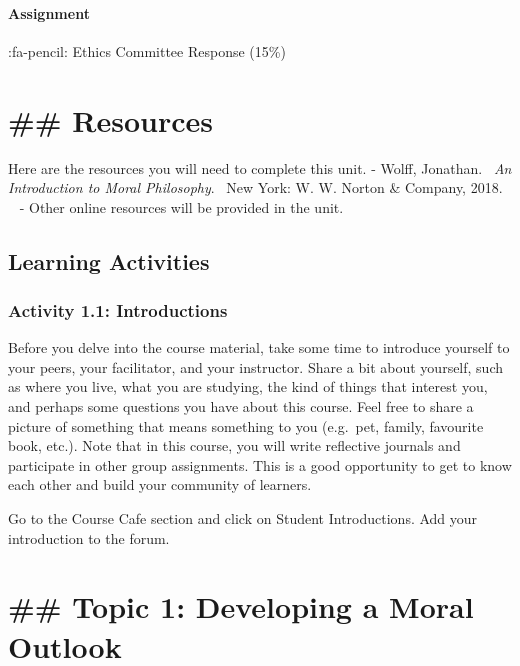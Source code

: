 \documentclass[
]{book}
\begin{document}
\hypertarget{assignment}{%
\paragraph{\texorpdfstring{\textbf{Assignment}}{Assignment}}\label{assignment}}

:fa-pencil: Ethics Committee Response (15\%)

\hypertarget{resources}{%
\section{\#\# Resources}\label{resources}}

Here are the resources you will need to complete this unit.
- Wolff, Jonathan. ~\emph{An Introduction to Moral Philosophy}. ~New York: W. W. Norton \& Company, 2018. ~
- Other online resources will be provided in the unit.

\hypertarget{learning-activities}{%
\subsection{Learning Activities}\label{learning-activities}}

\hypertarget{activity-1.1-introductions-1}{%
\subsubsection{Activity 1.1: Introductions}\label{activity-1.1-introductions-1}}

Before you delve into the course material, take some time to introduce yourself to your peers, your facilitator, and your instructor. Share a bit about yourself, such as where you live, what you are studying, the kind of things that interest you, and perhaps some questions you have about this course. Feel free to share a picture of something that means something to you (e.g.~pet, family, favourite book, etc.).
Note that in this course, you will write reflective journals and participate in other group assignments. This is a good opportunity to get to know each other and build your community of learners.

Go to the Course Cafe section and click on Student Introductions. Add your introduction to the forum.

\hypertarget{topic-1-developing-a-moral-outlook}{%
\section{\#\# Topic 1: Developing a Moral Outlook}\label{topic-1-developing-a-moral-outlook}}
\end{document}
